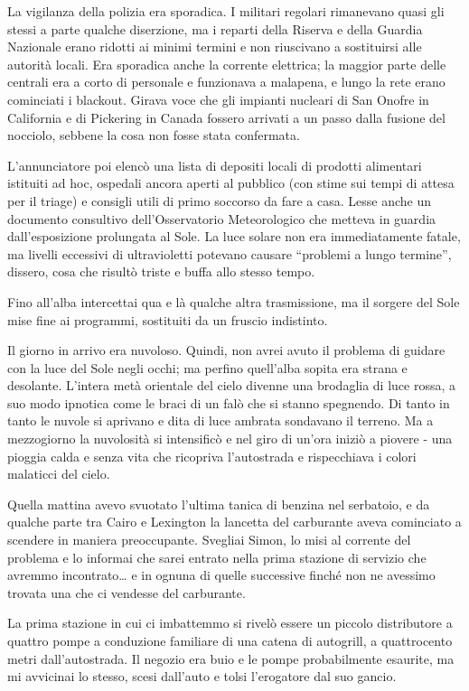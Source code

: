 La vigilanza della polizia era sporadica. I militari regolari rimanevano
quasi gli stessi a parte qualche diserzione, ma i reparti della Riserva
e della Guardia Nazionale erano ridotti ai minimi termini e non
riuscivano a sostituirsi alle autorità locali. Era sporadica anche la
corrente elettrica; la maggior parte delle centrali era a corto di
personale e funzionava a malapena, e lungo la rete erano cominciati i
blackout. Girava voce che gli impianti nucleari di San Onofre in
California e di Pickering in Canada fossero arrivati a un passo dalla
fusione del nocciolo, sebbene la cosa non fosse stata confermata.

L'annunciatore poi elencò una lista di depositi locali di prodotti
alimentari istituiti ad hoc, ospedali ancora aperti al pubblico (con
stime sui tempi di attesa per il triage) e consigli utili di primo
soccorso da fare a casa. Lesse anche un documento consultivo
dell'Osservatorio Meteorologico che metteva in guardia dall'esposizione
prolungata al Sole. La luce solare non era immediatamente fatale, ma
livelli eccessivi di ultravioletti potevano causare ``problemi a lungo
termine'', dissero, cosa che risultò triste e buffa allo stesso tempo.

\separatorefiori

Fino all'alba intercettai qua e là qualche altra trasmissione, ma il
sorgere del Sole mise fine ai programmi, sostituiti da un fruscio
indistinto.

Il giorno in arrivo era nuvoloso. Quindi, non avrei avuto il problema di
guidare con la luce del Sole negli occhi; ma perfino quell'alba sopita
era strana e desolante. L'intera metà orientale del cielo divenne una
brodaglia di luce rossa, a suo modo ipnotica come le braci di un falò
che si stanno spegnendo. Di tanto in tanto le nuvole si aprivano e dita
di luce ambrata sondavano il terreno. Ma a mezzogiorno la nuvolosità si
intensificò e nel giro di un'ora iniziò a piovere - una pioggia calda e
senza vita che ricopriva l'autostrada e rispecchiava i colori malaticci
del cielo.

Quella mattina avevo svuotato l'ultima tanica di benzina nel serbatoio,
e da qualche parte tra Cairo e Lexington la lancetta del carburante
aveva cominciato a scendere in maniera preoccupante. Svegliai Simon, lo
misi al corrente del problema e lo informai che sarei entrato nella
prima stazione di servizio che avremmo incontrato\ldots{} e in ognuna di
quelle successive finché non ne avessimo trovata una che ci vendesse del
carburante.

La prima stazione in cui ci imbattemmo si rivelò essere un piccolo
distributore a quattro pompe a conduzione familiare di una catena di
autogrill, a quattrocento metri dall'autostrada. Il negozio era buio e
le pompe probabilmente esaurite, ma mi avvicinai lo stesso, scesi
dall'auto e tolsi l'erogatore dal suo gancio.

